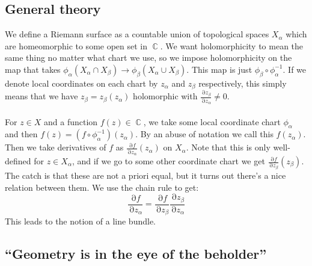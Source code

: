 \documentclass[12 pt]{article}
\DeclareMathOperator {\p} {\partial}
\DeclareMathOperator {\C} {\mathbb{C}}
\theoremstyle{plain}
\theoremstyle{definition}
\theoremstyle{remark}
\begin{document}
\subsection*{General theory}
We define a Riemann surface as a countable union of topological spaces $X_{\alpha}$ which are homeomorphic to some open set in $\C$. We want holomorphicity to mean the same thing no matter what chart we use, so we impose holomorphicity on the map that takes $\phi_{\alpha}(X_{\alpha} \cap X_{\beta}) \to \phi_{\beta}(X_{\alpha} \cup X_{\beta})$. This map is just $\phi_{\beta} \circ \phi_{\alpha}^{-1}$. If we denote local coordinates on each chart by $z_{\alpha}$ and $z_{\beta}$ respectively, this simply means that we have $z_{\beta} = z_{\beta}(z_{\alpha})$ holomorphic with $ \frac{\p z_{\beta}}{\p z_{\alpha}} \neq 0$.
\\
\\
For $z\in X$ and a function $f(z) \in \C$, we take some local coordinate chart $\phi_{\alpha}$ and then $f(z) = (f \circ \phi_{\alpha}^{-1})(z_{\alpha})$. By an abuse of notation we call this $f(z_{\alpha})$. Then we take derivatives of $f$ as $\frac{\p f}{\p z_{\alpha}} (z_{\alpha})$ on $X_{\alpha}$. Note that this is only well-defined for $z \in X_{\alpha}$, and if we go to some other coordinate chart we get $\frac{\p f}{\p z_{\beta}} (z_{\beta})$. The catch is that these are not a priori equal, but it turns out there's a nice relation between them. We use the chain rule to get:
\[     \frac{\p f}{\p z_{\alpha}} = \frac{\p f}{\p z_{\beta}} \frac{\p z_{\beta}}{\p z_{\alpha}}     \]
This leads to the notion of a line bundle.

\subsection*{``Geometry is in the eye of the beholder''}
\end{document}

